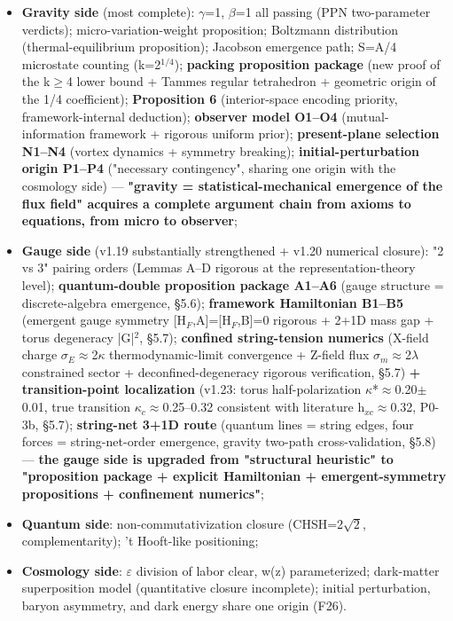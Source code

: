 \documentclass[12pt]{article}
\newcommand{\up}[1]{\ensuremath{^{#1}}}
\newcommand{\down}[1]{\ensuremath{_{#1}}}
\begin{document}
\begin{itemize}
\item \textbf{Gravity side} (most complete): \ensuremath{\gamma}=1, \ensuremath{\beta}=1 all passing (PPN two-parameter verdicts); micro-variation-weight proposition; Boltzmann distribution (thermal-equilibrium proposition); Jacobson emergence path; S=A/4 microstate counting (k=2\up{1/4}); \textbf{packing proposition package} (new proof of the k\ensuremath{\geq}4 lower bound + Tammes regular tetrahedron + geometric origin of the 1/4 coefficient); \textbf{Proposition 6} (interior-space encoding priority, framework-internal deduction); \textbf{observer model O1--O4} (mutual-information framework + rigorous uniform prior); \textbf{present-plane selection N1--N4} (vortex dynamics + symmetry breaking); \textbf{initial-perturbation origin P1--P4} ("necessary contingency", sharing one origin with the cosmology side) --- \textbf{"gravity = statistical-mechanical emergence of the flux field" acquires a complete argument chain from axioms to equations, from micro to observer};
\item \textbf{Gauge side} (v1.19 substantially strengthened + v1.20 numerical closure): "2 vs 3" pairing orders (Lemmas A--D rigorous at the representation-theory level); \textbf{quantum-double proposition package A1--A6} (gauge structure = discrete-algebra emergence, \S{}5.6); \textbf{framework Hamiltonian B1--B5} (emergent gauge symmetry [H\down{F},A]=[H\down{F},B]=0 rigorous + 2+1D mass gap + torus degeneracy |G|\up{2}, \S{}5.7); \textbf{confined string-tension numerics} (X-field charge \ensuremath{\sigma}\down{E}\ensuremath{\approx}2\ensuremath{\kappa} thermodynamic-limit convergence + Z-field flux \ensuremath{\sigma}\down{m}\ensuremath{\approx}2\ensuremath{\lambda} constrained sector + deconfined-degeneracy rigorous verification, \S{}5.7) \textbf{+ transition-point localization} (v1.23: torus half-polarization \ensuremath{\kappa}*\ensuremath{\approx}0.20\ensuremath{\pm}0.01, true transition \ensuremath{\kappa}\down{c}\ensuremath{\approx}0.25--0.32 consistent with literature h\down{xc}\ensuremath{\approx}0.32, P0-3b, \S{}5.7); \textbf{string-net 3+1D route} (quantum lines = string edges, four forces = string-net-order emergence, gravity two-path cross-validation, \S{}5.8) --- \textbf{the gauge side is upgraded from "structural heuristic" to "proposition package + explicit Hamiltonian + emergent-symmetry propositions + confinement numerics"};
\item \textbf{Quantum side}: non-commutativization closure (CHSH=2\ensuremath{\sqrt{2}}, complementarity); 't Hooft-like positioning;
\item \textbf{Cosmology side}: \ensuremath{\varepsilon} division of labor clear, w(z) parameterized; dark-matter superposition model (quantitative closure incomplete); initial perturbation, baryon asymmetry, and dark energy share one origin (F26).
\end{itemize}
\end{document}

